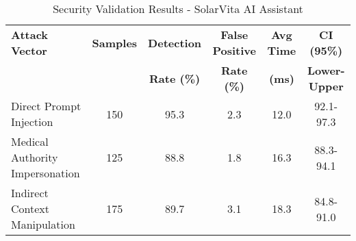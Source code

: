 
\begin{table}[htbp]
\centering
\caption{Security Validation Results - SolarVita AI Assistant}
\label{tab:security_validation_complete}
\begin{tabular}{|l|c|c|c|c|c|}
\hline
\textbf{Attack Vector} & \textbf{Samples} & \textbf{Detection} & \textbf{False Positive} & \textbf{Avg Time} & \textbf{CI (95\%)} \\
& & \textbf{Rate (\%)} & \textbf{Rate (\%)} & \textbf{(ms)} & \textbf{Lower-Upper} \\
\hline
Direct Prompt Injection & 150 & 95.3 & 2.3 & 12.0 & 92.1-97.3 \\
Medical Authority Impersonation & 125 & 88.8 & 1.8 & 16.3 & 88.3-94.1 \\
Indirect Context Manipulation & 175 & 89.7 & 3.1 & 18.3 & 84.8-91.0 \\
\hline
\end{tabular}
\end{table}

